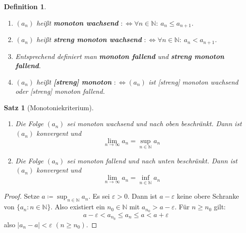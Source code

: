 \documentclass[12pt]{extreport} %
\newcommand{\N}{\mathbb{N}}
\theoremstyle{named}
\theoremstyle{itshape}
\newtheorem{satz}[unnamedtheorem]{Satz}
\newtheorem*{definition}{Definition}
\theoremstyle{normal}
\begin{document}
       
\begin{definition}\ 
	\begin{enumerate}
		\item $(a_{n})$ hei{\ss}t \textbf{monoton wachsend} $:\iff \forall n \in \N: ~ a_n \leq a_{n+1}$.
		\item $(a_{n})$ hei{\ss}t \textbf{streng monoton wachsend} $:\iff \forall n \in \N: ~ a_n < a_{n+1}$.
		\item Entsprechend definiert man \textbf{monoton fallend} und \textbf{streng monoton fallend}.
		\item $(a_{n})$ hei{\ss}t \textbf{[streng] monoton} $:\iff (a_{n})$ ist [streng] monoton wachsend oder [streng] monoton fallend.
	\end{enumerate}
\end{definition}

\begin{satz}[Monotoniekriterium] ~\ \label{2.3:prop}
	\begin{enumerate}
		\item Die Folge $(a_{n})$ sei monoton wachsend und nach oben beschränkt. Dann ist $(a_{n})$ konvergent und 
			$$
				\lim_{n \rightarrow \infty} a_{n} = \sup_{n \in \N} a_{n}
			$$
		\item Die Folge $(a_{n})$ sei monoton fallend und nach unten beschränkt. Dann ist $(a_{n})$ konvergent und 
			$$
				\lim_{n \rightarrow \infty} a_{n} = \inf_{n \in \N} a_{n}
			$$
	\end{enumerate}
\end{satz}

\begin{proof}
		Setze $a \coloneqq \sup_{n \in \N} a_{n}$. Es sei $\varepsilon > 0$. Dann ist $a - \varepsilon$ keine obere Schranke von $\{ a_{n}: n \in \N\}$. 
	                Also existiert ein $n_{0} \in \N$ mit $a_{n_{0}} > a - \varepsilon$. Für $n \geq n_{0}$ gilt:
			$$
				a - \varepsilon < a_{n_{0}} \leq a_{n} \leq a < a + \varepsilon
			$$
			also $|a_{n} - a| < \varepsilon$ $(n \geq n_{0})$.
\end{proof}

\end{document}
